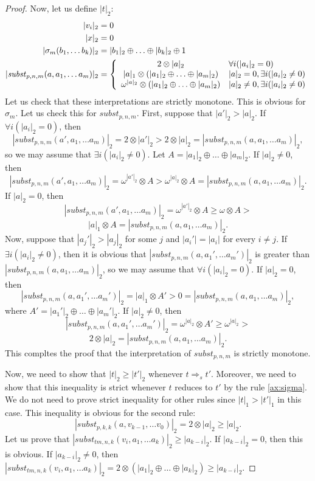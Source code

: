 \documentclass[reqno]{amsart}
\theoremstyle{definition}
\theoremstyle{remark}
\newcommand{\subst}{\mathit{subst}}
\newcommand{\tm}{\mathit{tm}}
\numberwithin{figure}{section}
\begin{document}
\begin{proof}
Now, let us define $|t|_2$:
\begin{align*}
|v_i|_2 & = 0 \\
|x|_2 & = 0 \\
|\sigma_m(b_1, \ldots b_k)|_2 & = |b_1|_2 \oplus \ldots \oplus |b_k|_2 \oplus 1 \\
|\subst_{p,n,m}(a, a_1, \ldots a_m)|_2 & = 
\left\{
\begin{array}{c l}	
     2 \otimes |a|_2 & \forall i (|a_i|_2 = 0) \\
     |a|_1 \otimes (|a_1|_2 \oplus \ldots \oplus |a_m|_2) & |a|_2 = 0, \exists i (|a_i|_2 \neq 0) \\
     \omega^{|a|_2} \otimes (|a_1|_2 \oplus \ldots \oplus |a_m|_2) & |a|_2 \neq 0, \exists i (|a_i|_2 \neq 0)
\end{array}\right.
\end{align*}
Let us check that these interpretations are strictly monotone.
This is obvious for $\sigma_m$.
Let us check this for $\subst_{p,n,m}$.
First, suppose that $|a'|_2 > |a|_2$.
If $\forall i (|a_i|_2 = 0)$, then
\[ |\subst_{p,n,m}(a', a_1, \ldots a_m)|_2 = 2 \otimes |a'|_2 > 2 \otimes |a|_2 = |\subst_{p,n,m}(a, a_1, \ldots a_m)|_2, \]
so we may assume that $\exists i (|a_i|_2 \neq 0)$.
Let $A = |a_1|_2 \oplus \ldots \oplus |a_m|_2$.
If $|a|_2 \neq 0$, then
\[ |\subst_{p,n,m}(a', a_1, \ldots a_m)|_2 = \omega^{|a'|_2} \otimes A > \omega^{|a|_2} \otimes A = |\subst_{p,n,m}(a, a_1, \ldots a_m)|_2. \]
If $|a|_2 = 0$, then
\[ |\subst_{p,n,m}(a', a_1, \ldots a_m)|_2 = \omega^{|a'|_2} \otimes A \geq \omega \otimes A > \]
\[ |a|_1 \otimes A = |\subst_{p,n,m}(a, a_1, \ldots a_m)|_2. \]
Now, suppose that $|a_j'|_2 > |a_j|_2$ for some $j$ and $|a_i'| = |a_i|$ for every $i \neq j$.
If $\exists i (|a_i|_2 \neq 0)$, then it is obvious that $|\subst_{p,n,m}(a, a_1', \ldots a_m')|_2$ is greater than $|\subst_{p,n,m}(a, a_1, \ldots a_m)|_2$,
so we may assume that $\forall i (|a_i|_2 = 0)$.
If $|a|_2 = 0$, then
\[ |\subst_{p,n,m}(a, a_1', \ldots a_m')|_2 = |a|_1 \otimes A' > 0 = |\subst_{p,n,m}(a, a_1, \ldots a_m)|_2, \]
where $A' = |a_1'|_2 \oplus \ldots \oplus |a_m'|_2$.
If $|a|_2 \neq 0$, then
\[ |\subst_{p,n,m}(a, a_1', \ldots a_m')|_2 = \omega^{|a|_2} \otimes A' \geq \omega^{|a|_2} > \]
\[ 2 \otimes |a|_2 = |\subst_{p,n,m}(a, a_1, \ldots a_m)|_2. \]
This compltes the proof that the interpretation of $\subst_{p,n,m}$ is strictly monotone.

Now, we need to show that $|t|_2 \geq |t'|_2$ whenever $t \Rightarrow_s t'$.
Moreover, we need to show that this inequality is strict whenever $t$ reduces to $t'$ by the rule \eqref{ax:sigma}.
We do not need to prove strict inequality for other rules since $|t|_1 > |t'|_1$ in this case.
This inequality is obvious for the second rule:
\[ |\subst_{p,k,k}(a, v_{k-1}, \ldots v_0)|_2 = 2 \otimes |a|_2 \geq |a|_2. \]
Let us prove that $|\subst_{\tm,n,k}(v_i, a_1, \ldots a_k)|_2 \geq |a_{k-i}|_2$.
If $|a_{k-i}|_2 = 0$, then this is obvious.
If $|a_{k-i}|_2 \neq 0$, then $|\subst_{\tm,n,k}(v_i, a_1, \ldots a_k)|_2 = 2 \otimes (|a_1|_2 \oplus \ldots \oplus |a_k|_2) \geq |a_{k-i}|_2$.


\end{proof}
\end{document}
